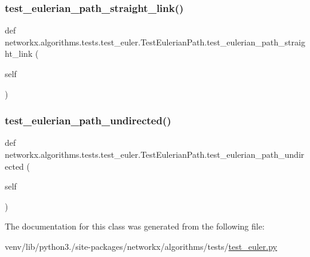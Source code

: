 \subsubsection{\texorpdfstring{test\+\_\+eulerian\+\_\+path\+\_\+straight\+\_\+link()}{test\_eulerian\_path\_straight\_link()}}
{\footnotesize\ttfamily def networkx.\+algorithms.\+tests.\+test\+\_\+euler.\+Test\+Eulerian\+Path.\+test\+\_\+eulerian\+\_\+path\+\_\+straight\+\_\+link (\begin{DoxyParamCaption}\item[{}]{self }\end{DoxyParamCaption})}

\mbox{\label{classnetworkx_1_1algorithms_1_1tests_1_1test__euler_1_1TestEulerianPath_a73049fcf9b844ed61a7877f9c6c487d5}} 
\subsubsection{\texorpdfstring{test\+\_\+eulerian\+\_\+path\+\_\+undirected()}{test\_eulerian\_path\_undirected()}}
{\footnotesize\ttfamily def networkx.\+algorithms.\+tests.\+test\+\_\+euler.\+Test\+Eulerian\+Path.\+test\+\_\+eulerian\+\_\+path\+\_\+undirected (\begin{DoxyParamCaption}\item[{}]{self }\end{DoxyParamCaption})}



The documentation for this class was generated from the following file\+:\begin{DoxyCompactItemize}
\item 
venv/lib/python3./site-\/packages/networkx/algorithms/tests/\hyperlink{test__euler_8py}{test\+\_\+euler.\+py}\end{DoxyCompactItemize}
